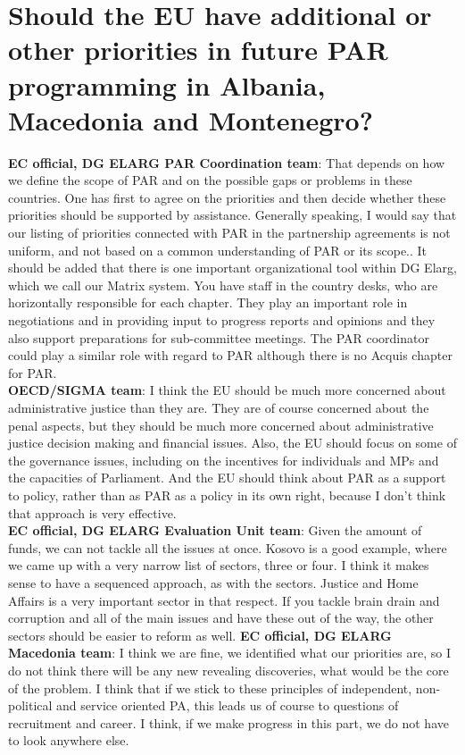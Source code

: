 \section{Should the EU have additional or other priorities in future PAR programming in Albania, Macedonia and Montenegro?}
\label{sec:montenegro3}
\textbf{EC official, DG ELARG PAR Coordination team}: That depends on  how we define the scope of PAR and  on the possible gaps or problems in these countries. One has first to agree on the priorities and then decide whether these priorities should be supported by assistance. Generally speaking, I would say that our listing  of priorities connected with PAR in the partnership agreements is not uniform, and  not based on a common understanding of PAR or its scope.. It should be added that there is one important organizational tool within DG Elarg, which we call our Matrix system. You have staff in the  country desks, who are horizontally responsible for each chapter. They play an important role in negotiations and in providing input to progress reports and opinions and they also support preparations for sub-committee meetings. The PAR coordinator could play a similar role with regard to PAR  although there is no Acquis chapter for PAR.\\
\textbf{OECD/SIGMA team}: I think the EU should be much more concerned about administrative justice than they are. They are of course concerned about the penal aspects, but they should be much more concerned about administrative justice decision making and financial issues. Also, the EU should focus on some of the governance issues, including on the incentives for individuals and MPs and the capacities of Parliament. And the EU should think about PAR as a support to policy, rather than as PAR as a policy in its own right, because I don't think that approach is very effective.\\
\textbf{EC official, DG ELARG Evaluation Unit team}: Given the amount of funds, we can not tackle all the issues at once. Kosovo is a good example, where we came up with a very narrow list of sectors, three or four. I think it makes sense to have a sequenced approach, as with the sectors. Justice and Home Affairs is a very important sector in that respect. If you tackle brain drain and corruption and all of the main issues and have these out of the way, the other sectors should be easier to reform as well.
\textbf{EC official, DG ELARG Macedonia team}: I think we are fine, we identified what our priorities are, so I do not think there will be any new revealing discoveries, what would be the core of the problem. I think that if we stick to these principles of independent, non-political and service oriented PA, this leads us of course to questions of recruitment and career. I think, if we make progress in this part, we do not have to look anywhere else.\\
